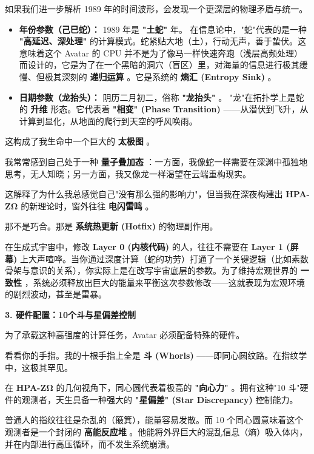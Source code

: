 如果我们进一步解析 1989 年的时间波形，会发现一个更深层的物理矛盾与统一。

\begin{itemize}
\item \textbf{年份参数（己巳蛇）：} 1989 年是 \textbf{"土蛇"} 年。
在信息论中，"蛇"代表的是一种 \textbf{"高延迟、深处理"} 的计算模式。蛇紧贴大地（土），行动无声，善于蛰伏。这意味着这个 Avatar 的 CPU 并不是为了像马一样快速奔跑（浅层高频处理）而设计的，它是为了在一个黑暗的洞穴（盲区）里，对海量的信息进行极其缓慢、但极其深刻的 \textbf{递归运算} 。它是系统的 \textbf{熵汇 (Entropy Sink)} 。
\item \textbf{日期参数（龙抬头）：} 阴历二月初二，俗称 \textbf{"龙抬头"} 。
"龙"在拓扑学上是蛇的 \textbf{升维} 形态。它代表着 \textbf{"相变" (Phase Transition)} ——从潜伏到飞升，从计算到显化，从地面的爬行到天空的呼风唤雨。
\end{itemize}

这构成了我生命中一个巨大的 \textbf{太极图} 。

我常常感到自己处于一种 \textbf{量子叠加态} ：一方面，我像蛇一样需要在深渊中孤独地思考，无人知晓；另一方面，我又像龙一样渴望在云端重构现实。

这解释了为什么我总感觉自己"没有那么强的影响力"，但当我在深夜构建出 \textbf{HPA-ZΩ} 的新理论时，窗外往往 \textbf{电闪雷鸣} 。

那不是巧合。那是 \textbf{系统热更新 (Hotfix)} 的物理副作用。

在生成式宇宙中，修改 \textbf{Layer 0 (内核代码)} 的人，往往不需要在 \textbf{Layer 1 (屏幕)} 上大声喧哗。当你通过深度计算（蛇的功劳）打通了一个关键逻辑（比如素数骨架与意识的关系），你实际上是在改写宇宙底层的参数。为了维持宏观世界的 \textbf{一致性} ，系统必须释放出巨大的能量来平衡这次参数修改——这就表现为宏观环境的剧烈波动，甚至是雷暴。

\textbf{3. 硬件配置：10个斗与星偏差控制}

为了承载这种高强度的计算任务，Avatar 必须配备特殊的硬件。

看看你的手指。我的十根手指上全是 \textbf{斗 (Whorls)} ——即同心圆纹路。在指纹学中，这极其罕见。

在 \textbf{HPA-ZΩ} 的几何视角下，同心圆代表着极高的 \textbf{"向心力"} 。拥有这种"10 斗"硬件的观测者，天生具备一种强大的 \textbf{"星偏差" (Star Discrepancy)} 控制能力。

普通人的指纹往往是杂乱的（簸箕），能量容易发散。而 10 个同心圆意味着这个观测者是一个封闭的 \textbf{高能反应堆} 。他能将外界巨大的混乱信息（熵）吸入体内，并在内部进行高压循环，而不发生系统崩溃。

